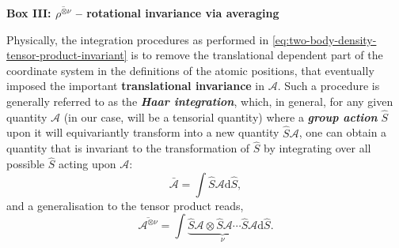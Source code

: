 \begin{myquote}
\textbf{Box III: $\overline{\rho^{\otimes \nu}}$ -- rotational invariance via averaging}

\footnotesize
Physically, the integration procedures as performed in \cref{eq:two-body-density-tensor-product-invariant} is to remove the translational dependent part of the coordinate system in the definitions of the atomic positions, that eventually imposed the important \textbf{translational invariance} in $\mathcal{A}$. Such a procedure is generally referred to as the \emph{\textbf{Haar integration}}, which, in general, for any given quantity $\mathcal{A}$ (in our case, will be a tensorial quantity) where a \textbf{\textit{group action}} $\hat{S}$ upon it will equivariantly transform into a new quantity $\hat{S}\mathcal{A}$, one can obtain a  quantity that is invariant to the transformation of $\hat{S}$ by integrating over all possible $\hat{S}$ acting upon $\mathcal{A}$:
\begin{equation}
    \label{eq:Harr_integration}
    \bar{\mathcal{A}}=\int\hat{S}\mathcal{A}\mathrm{d}\hat{S},
\end{equation}
and a generalisation to the tensor product reads,
\begin{equation}
    \label{eq:Harr_integration_tensor}
    \overline{\mathcal{A}^{\otimes\nu}}=\int\underbrace{\hat{S}\mathcal{A}\otimes \hat{S}\mathcal{A}\cdots\hat{S}\mathcal{A}}_{\nu} \mathrm{d}\hat{S}.
\end{equation}


\end{myquote}
